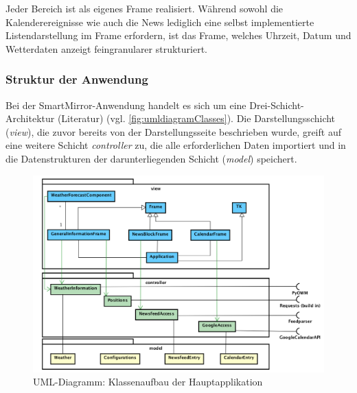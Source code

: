 \begin{minipage}{\textwidth}
	
\end{minipage}

Jeder Bereich ist als eigenes Frame realisiert. Während sowohl die Kalenderereignisse wie auch die News lediglich eine selbst implementierte Listendarstellung im Frame erfordern, ist das Frame, welches Uhrzeit, Datum und Wetterdaten anzeigt feingranularer strukturiert.

 
\subsubsection*{Struktur der Anwendung}

Bei der SmartMirror-Anwendung handelt es sich um eine Drei-Schicht-Architektur (Literatur) (vgl. \autoref{fig:umldiagramClasses}). Die Darstellungsschicht (\textit{view}), die zuvor bereits von der Darstellungsseite  beschrieben wurde, greift auf eine weitere Schicht \textit{controller} zu, die alle erforderlichen Daten importiert und in die Datenstrukturen der darunterliegenden Schicht (\textit{model}) speichert.

\begin{figure}
	\centering
	\includegraphics[width=0.7\linewidth]{bilder/umlDiagram_v3}
	\caption[UML-Diagramm: Klassenaufbau der Hauptapplikation]{UML-Diagramm: Klassenaufbau der Hauptapplikation}
	\label{fig:umldiagramClasses}
\end{figure}

